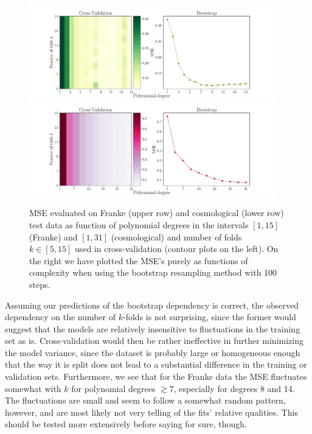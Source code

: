 \documentclass[aps,pra,english,notitlepage,reprint,nofootinbib]{revtex4-1}  %
\begin{document}
\begin{figure}
  \vspace*{-5pt}
  \centering %
  \includegraphics[trim = 0 0.8cm 0 0,clip,width=0.95\textwidth,keepaspectratio]{../figs/f_kfold_vs_bootstrap.pdf}
  \centering
  \includegraphics[width=0.95\textwidth]{../figs/g_kfold_vs_bootstrap.pdf}
  \caption{MSE evaluated on Franke (upper row) and cosmological (lower row) test data as function of polynomial degrees in the intervals $[1,15]$ (Franke) and $[1, 31]$ (cosmological) and number of folds $k\in[5, 15]$ used in cross-validation (contour plots on the left). On the right we have plotted the MSE's purely as functions of complexity when using the bootstrap resampling method with 100 steps.}\label{fig:kfold vs bootstrap}
  \vspace*{-5pt}
\end{figure}

Assuming our predictions of the bootstrap dependency is correct, the observed dependency on the number of $k$-folds is not surprising, since the former would suggest that the models are relatively insensitive to fluctuations in the training set as is. Cross-validation would then be rather ineffective in further minimizing the model variance, since the dataset is probably large or homogeneous enough that the way it is split does not lead to a substantial difference in the training or validation sets. Furthermore, we see that for the Franke data the MSE fluctuates somewhat with $k$ for polynomial degrees $\gtrsim7$, especially for degrees 8 and 14. The fluctuations are small and seem to follow a somewhat random pattern, however, and are most likely not very telling of the fits' relative qualities. This should be tested more extensively before saying for sure, though.
\end{document}
